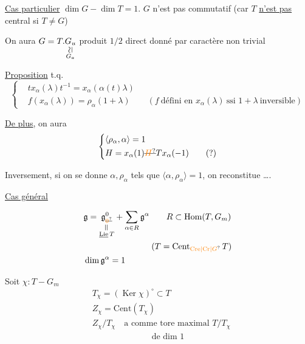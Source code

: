\uline{Cas particulier} \quad $\dim G-\dim T=1$. $G$ n'est pas commutatif (car $T$ \uline{n'est pas} central si $T\neq G$)

On aura $G=T.\underset{\substack{\rotatebox{90}{$\simeq$}\\G_a}}{G_u}$ \quad produit $1/2$ direct donné par caractère non trivial

\uline{Proposition}
t.q.
\[
\left\{\begin{aligned}
&t x_\alpha(\lambda)t^{-1}=x_\alpha(\alpha(t)\lambda)\\
&f(x_\alpha(\lambda))=\rho_\alpha(1+\lambda)\qquad
  (f\ \text{défini en }x_\alpha(\lambda)\ \text{ssi }1+\lambda\ \text{inversible})
\end{aligned}\right.
\]

\uline{De plus}, on aura
\[
\left\{\begin{aligned}
&\langle\rho_\alpha,\alpha\rangle=1\\
&H=x_\alpha(1)\deleted{\unsure{H}}T x_\alpha(-1)\qquad (?)
\end{aligned}\right.
\]

Inversement, si on se donne $\alpha,\rho_\alpha$ tels que $\langle\alpha,\rho_\alpha\rangle=1$, on reconstitue \ldots.

\uline{Cas général}

\[
\begin{aligned}
&\mathfrak g=\underset{\substack{\rotatebox{90}{$=$}\\\underline{\mathrm{Lie}}\,T}}{\mathfrak g^{0}_{\deleted{\unsure{0}}}}
 +\sum_{\alpha\in R}\mathfrak g^\alpha
 \qquad R\subset\mathrm{Hom}(T,G_m)\\
&\hspace{8em}(T=\mathrm{Cent}_{\unsure{\mathrm{Cre}|\mathrm{Cr}|G}}\,T)\\
&\dim\mathfrak g^\alpha=1
\end{aligned}
\]

Soit $\chi:T\mathbin{-}G_m$
\[
\begin{aligned}
&T_\chi=(\operatorname{Ker}\chi)^\circ\subset T\\
&Z_\chi=\mathrm{Cent}(T_\chi)\\
&Z_\chi/T_\chi\quad\text{a comme tore maximal }T/T_\chi\\
&\hspace{7em}\text{de dim }1
\end{aligned}
\]

